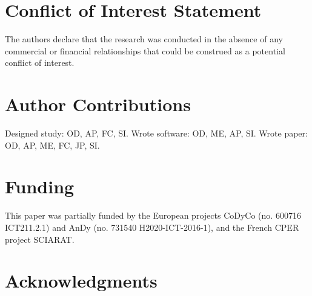 \documentclass[utf8]{frontiersSCNS} %
\begin{document}
\section*{Conflict of Interest Statement}

The authors declare that the research was conducted in the absence of any commercial or financial relationships that could be construed as a potential conflict of interest.

\section*{Author Contributions}

Designed study: OD, AP, FC, SI. Wrote software: OD, ME, AP, SI. Wrote paper: OD, AP, ME, FC, JP, SI. 

\section*{Funding}

This paper was partially funded by the European projects CoDyCo (no. 600716 ICT211.2.1) and AnDy (no. 731540 H2020-ICT-2016-1), and the French CPER project SCIARAT.

\section*{Acknowledgments}
\end{document}
